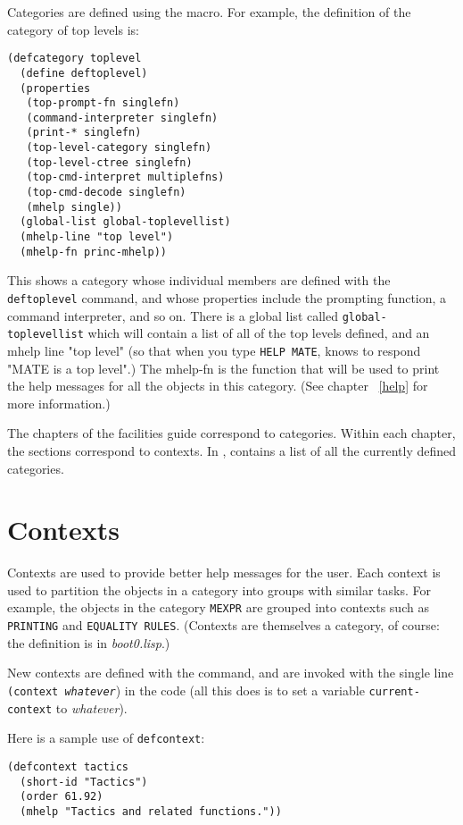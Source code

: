 Categories are defined using the  macro. For example, the 
definition of the category of \TPS top levels is:
\begin{verbatim}
(defcategory toplevel
  (define deftoplevel)
  (properties
   (top-prompt-fn singlefn)
   (command-interpreter singlefn)
   (print-* singlefn)
   (top-level-category singlefn)
   (top-level-ctree singlefn)
   (top-cmd-interpret multiplefns)
   (top-cmd-decode singlefn)
   (mhelp single))
  (global-list global-toplevellist)
  (mhelp-line "top level")
  (mhelp-fn princ-mhelp))
\end{verbatim}

This shows a category whose individual members are defined with the {\tt deftoplevel} command, and
whose properties include the prompting function, a command interpreter, and so on. There is a 
global list called {\tt global-toplevellist} which will contain a list of all of the top levels 
defined, and an mhelp line "top level" (so that when you type {\tt HELP MATE}, \TPS knows to respond
"MATE is a top level".) The mhelp-fn is the function that will be used to print the help messages
for all the objects in this category. (See chapter ~\ref{help} for more information.)

The chapters of the facilities guide correspond to categories.
Within each chapter, the sections correspond to contexts.
In \tps,  contains a list of all the
currently defined categories.

\section{Contexts}

Contexts are used to provide better help messages for the user. Each context is used to partition
the objects in a category into groups with similar tasks. For example, the objects in the 
category {\tt MEXPR} are grouped into contexts such as {\tt PRINTING} and {\tt EQUALITY RULES}.
(Contexts are themselves a category, of course: the definition is in {\it boot0.lisp}.)

New contexts are defined with the  command, and are invoked with the 
single line {\tt (context {\it whatever}}) in the code (all this does is to set a variable 
{\tt current-context} to {\it whatever}). 

Here is a sample use of {\tt defcontext}:
\begin{verbatim}
(defcontext tactics
  (short-id "Tactics")
  (order 61.92)
  (mhelp "Tactics and related functions."))
\end{verbatim}

